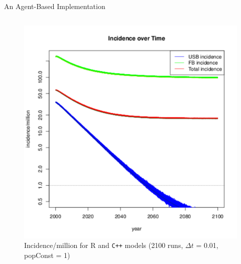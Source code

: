 \documentclass[final]{beamer}
\begin{document}
\begin{frame}
\begin{columns}[T]
\begin{column}{.3\textwidth}
\begin{block}{An Agent-Based Implementation}
\begin{columns}[T]
\begin{column}{.45\textwidth}
\begin{figure}[h]
\begin{center}
                \includegraphics[height=0.8\textwidth,width=\textwidth]{finalRunSmall}
              \end{center}
              \caption{Incidence/million for R and \texttt{C++} models (2100 runs, $\Delta t$ = 0.01, popConst = 1)}
              \label{fig:finalRun}
            \end{figure}
          \end{column}
        \end{columns}
      \end{block}
      

\end{column}
\end{columns}
\end{frame}
\end{document}
